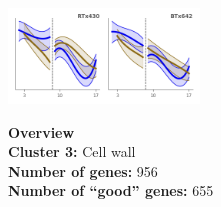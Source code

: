 \begin{multicols}{2}
\includegraphics[width=2in]{figures/clusters/root_Preflowering_2.png}
\columnbreak

\noindent \textbf{Overview}\\\textbf{Cluster 3:} Cell wall \\
\textbf{Number of genes:} 956 \\
\textbf{Number of ``good'' genes:} 655 \\
\end{multicols}

